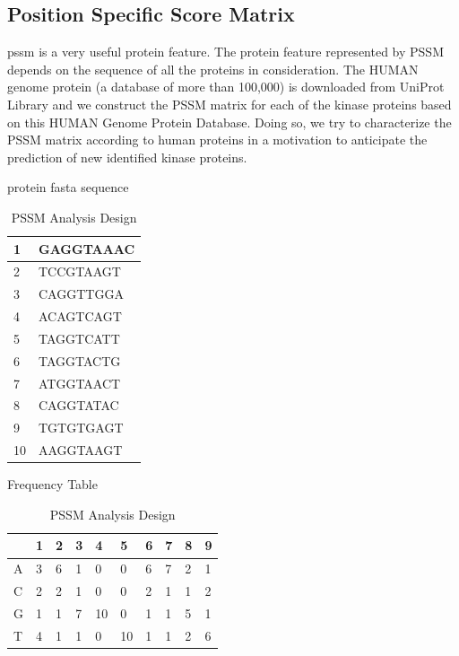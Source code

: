 \subsection{Position Specific Score Matrix}

\acrfull{pssm} is a very useful protein feature. The protein feature represented by PSSM depends on the sequence of all the proteins in consideration. The HUMAN genome protein (a database of more than 100,000) is downloaded from UniProt Library and we construct the PSSM matrix for each of the kinase proteins based on this HUMAN Genome Protein Database. Doing so, we try to characterize the PSSM matrix according to human proteins in a motivation to anticipate the prediction of new identified kinase proteins.

\begin{table}
  \centering
  \caption{PSSM Analysis Design} 
  \begin{subtable}[]{protein fasta sequence}
    \begin{tabular}{|l|l|}
    \hline
    
    1 & GAGGTAAAC \\ \hline
    2 & TCCGTAAGT \\ \hline
    3 & CAGGTTGGA \\ \hline
    4 & ACAGTCAGT \\ \hline
    5 & TAGGTCATT \\ \hline
    6 & TAGGTACTG \\ \hline
    7 & ATGGTAACT \\ \hline
    8 & CAGGTATAC \\ \hline
    9 & TGTGTGAGT \\ \hline
    10 & AAGGTAAGT \\ \hline
    
    \end{tabular}
    
  \end{subtable}

  \begin{subtable}[]{Frequency Table}
    \begin{tabular}{|l|l|l|l|l|l|l|l|l|l|}
    \hline
    
     & 1 & 2 & 3 & 4 & 5 & 6 & 7 & 8 & 9 \\ \hline
    A & 3 & 6 & 1 & 0 & 0 & 6 & 7 & 2 & 1 \\ \hline
    C & 2 & 2 & 1 & 0 & 0 & 2 & 1 & 1 & 2 \\ \hline
    G & 1 & 1 & 7 & 10 & 0 & 1 & 1 & 5 & 1 \\ \hline
    T & 4 & 1 & 1 & 0 & 10 & 1 & 1 & 2 & 6 \\ \hline
    

\end{tabular}
\end{subtable}
\end{table}
